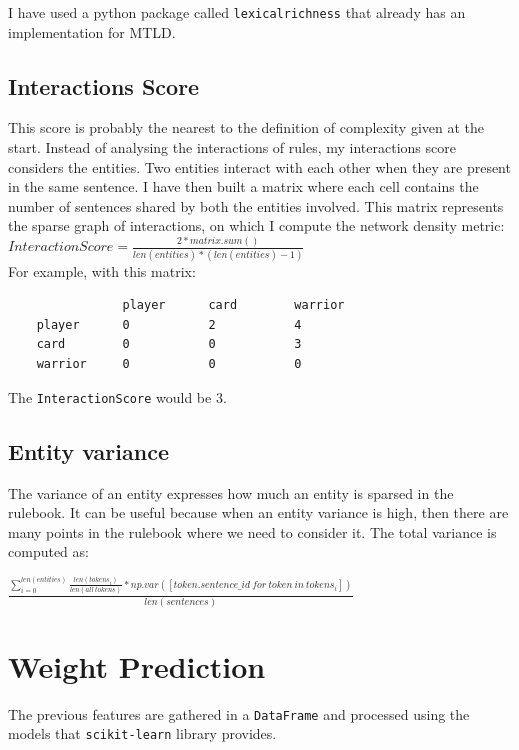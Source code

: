 \documentclass[runningheads]{llncs}
\begin{document}
I have used a python package called \verb|lexicalrichness| that already has an implementation for MTLD. 

\subsection{Interactions Score}
This score is probably the nearest to the definition of complexity given at the start. Instead of analysing the interactions of rules, my interactions score considers the entities. Two entities interact with each other when they are present in the same sentence. I have then built a matrix where each cell contains the number of sentences shared by both the entities involved. This matrix represents the sparse graph of interactions, on which I compute the network density metric:\\

$ InteractionScore = \frac{2 * matrix.sum()}{len(entities) * (len(entities) - 1)} $ \\

\noindent For example, with this matrix:

\begin{verbatim}
                player      card        warrior
    player      0           2           4       
    card        0           0           3
    warrior     0           0           0
\end{verbatim}

\noindent The \verb|InteractionScore| would be 3.

\subsection{Entity variance}
The variance of an entity expresses how much an entity is sparsed in the rulebook. It can be useful because when an entity variance is high, then there are many points in the rulebook where we need to consider it. The total variance is computed as:

$\frac{\sum_{i = 0}^{len(entities)} \frac{len(tokens_i)}{len(all\ tokens)} * np.var([token.sentence\_id\ for\ token\ in\ tokens_i])}{len(sentences)} $

\section{Weight Prediction}
The previous features are gathered in a \verb|DataFrame| and processed using the models that \verb|scikit-learn| library provides.
\end{document}
